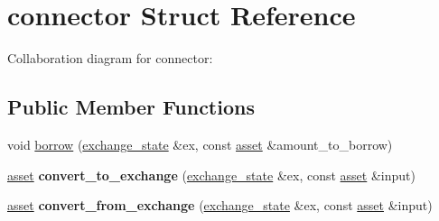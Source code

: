\hypertarget{structconnector}{}\section{connector Struct Reference}
\label{structconnector}


Collaboration diagram for connector\+:
\subsection*{Public Member Functions}
\begin{DoxyCompactItemize}
\item 
void \mbox{\hyperlink{structconnector_a40708991ac8ca1e83fac75b482724ca5}{borrow}} (\mbox{\hyperlink{structexchange__state}{exchange\+\_\+state}} \&ex, const \mbox{\hyperlink{structasset}{asset}} \&amount\+\_\+to\+\_\+borrow)
\item 
\mbox{\label{structconnector_ab937e246234e7b060c5d9f078676ec09}} 
\mbox{\hyperlink{structasset}{asset}} {\bfseries convert\+\_\+to\+\_\+exchange} (\mbox{\hyperlink{structexchange__state}{exchange\+\_\+state}} \&ex, const \mbox{\hyperlink{structasset}{asset}} \&input)
\item 
\mbox{\label{structconnector_aee5e4a4352faf3c4a913b2036d2965d0}} 
\mbox{\hyperlink{structasset}{asset}} {\bfseries convert\+\_\+from\+\_\+exchange} (\mbox{\hyperlink{structexchange__state}{exchange\+\_\+state}} \&ex, const \mbox{\hyperlink{structasset}{asset}} \&input)
\end{DoxyCompactItemize}
